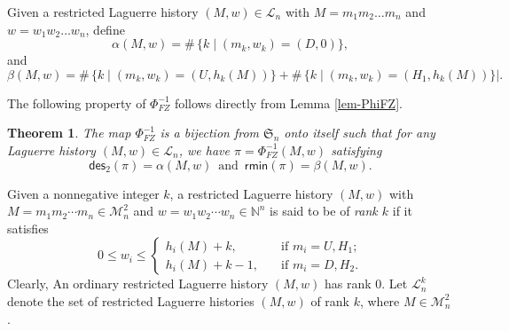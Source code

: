 \documentclass[12pt]{article}
\numberwithin{equation}{section}
\theoremstyle{plain}
\newtheorem{theorem}{Theorem}[section]
\def\des{\mathsf{des}}
\def\rmin{\mathsf{rmin}}
\def\L{\mathcal{L}}
\begin{document}
      	 Given a restricted 
      	   Laguerre history $(M,w)\in\L_{n}$ with $M=m_1m_2\ldots m_n$ and $w=w_1w_2\ldots w_n$,  define
      	   $$
      	\alpha(M,w)=\#\,\{k\mid (m_k, w_k)=(D, 0)\},
      	   $$
      	   and 
      	  $$
      	  \beta(M,w)=  \#\,\{k\mid (m_k, w_k)=(U, h_k(M))\}+\#\,\{k\mid (m_k, w_k)=(H_1, h_k(M))\}|.
      	   $$
      	    
      	   
      	   The following property of $\Phi^{-1}_{FZ}$ follows directly from Lemma \ref{lem-PhiFZ}.
      	   \begin{theorem}\label{thm-PhiFZ}
      	The map $\Phi^{-1}_{FZ}$ is a bijection from $\mathfrak{S}_n$ onto itself	 such that for  any  Laguerre history $(M,w)\in\L_{n}$,  we have
      	$\pi=\Phi^{-1}_{FZ}(M,w)$ satisfying 
      		\begin{equation}\label{eq-des_2-Mot}
      			\des_2(\pi)= \alpha(M,w)\,\, \, \mbox{and}\,\,\, \rmin(\pi)=\beta(M,w).
      		\end{equation}
      			\end{theorem}
      
       Given a nonnegative integer $k$, a  restricted Laguerre history    $(M,w)$ with $M=m_1m_2\cdots m_n\in\mathcal{M}^2_n$ and $w=w_1w_2\cdots w_n\in \mathbb{N}^n$ is said to be of {\em rank $k$ }  if it satisfies  
      $$
      0\leq w_i\leq \begin{cases}
      	h_i(M)+k,\quad&\text{if $m_i=U, H_1$};\\
      	h_i(M)+k-1, \quad&\text{if $m_i=D, H_2$}.
      \end{cases}
      $$
      Clearly,   An ordinary   restricted Laguerre history    $(M,w)$   has rank $0$.    Let $\mathcal{L}_n^k$ denote the set of restricted Laguerre histories  $(M,w)$ of rank $k$, where $M\in \mathcal{M}^2_n$.
      
\end{document}
